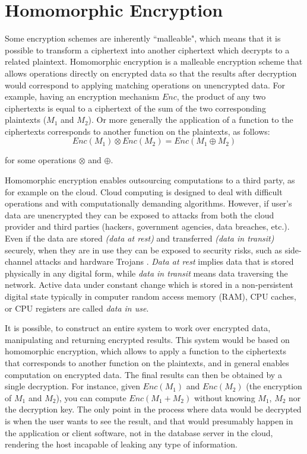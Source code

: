 \section{Homomorphic Encryption}\label{s:homomorphic-encryption}

Some encryption schemes are inherently ``malleable", which means that it is possible to transform a ciphertext into another ciphertext which decrypts to a related plaintext.
Homomorphic encryption is a malleable encryption scheme that allows operations directly on encrypted data so that the results after decryption would correspond to applying matching operations on unencrypted data.
For example, having an encryption mechanism $Enc$, the product of any two ciphertexts is equal to a ciphertext of the sum of the two corresponding plaintexts ($M_1$ and $M_2$). Or more generally the application of a function to the ciphertexts corresponds to another function on the plaintexts, as follows:
\begin{equation}\label{eq:homomorphic}
  Enc(M_1) \otimes Enc(M_2) = Enc(M_1 \oplus M_2)
\end{equation}

for some operations $\otimes$ and $\oplus$.

Homomorphic encryption enables outsourcing computations to a third party, as for example on the cloud.
Cloud computing is designed to deal with difficult operations and with computationally demanding algorithms.
However, if user's data are unencrypted they can be exposed to attacks from both the cloud provider and third parties (hackers, government agencies, data breaches, etc.).
Even if the data are stored \textit{(data at rest)} and transferred \textit{(data in transit)} securely, when they are in use they can be exposed to security risks, such as side-channel attacks \cite{zhang2012cross} and hardware Trojans \cite{becker2013stealthy, tsoutsos2014advanced}.
\textit{Data at rest} implies data that is stored physically in any digital form, while \textit{data in transit} means data traversing the network.
Active data under constant change which is stored in a non-persistent digital state typically in computer random access memory (RAM), CPU caches, or CPU registers are called \textit{data in use}.


It is possible, to construct an entire system to work over encrypted data, manipulating and returning encrypted results.
This system would be based on homomorphic encryption, which allows to apply a function to the ciphertexts that corresponds to another function on the plaintexts, and in general enables computation on encrypted data.
The final results can then be obtained by a single decryption.
For instance, given $Enc(M_1)$ and $Enc(M_2)$ (the encryption of $M_1$ and $M_2$), you can compute $Enc(M_1 + M_2)$ without knowing $M_1$, $M_2$ nor the decryption key.
The only point in the process where data would be decrypted is when the user wants to see the result, and that would presumably happen in the application or client software, not in the database server in the cloud, rendering the host incapable of leaking any type of information.


